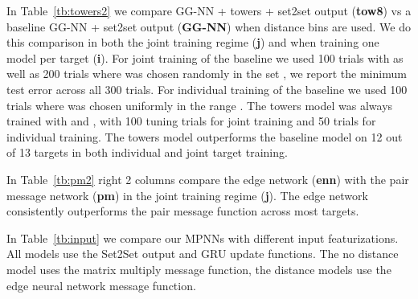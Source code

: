 \documentclass{article}
\begin{document}
In Table~\ref{tb:towers2} we compare GG-NN + towers + set2set output (\textbf{tow8}) vs a baseline GG-NN + set2set output (\textbf{GG-NN}) when distance bins are used.  We do this comparison in both the joint training regime (\textbf{j}) and when training one model per target (\textbf{i}). For joint training of the baseline we used 100 trials with  as well as 200 trials where  was chosen randomly in the set , we report the minimum test error across all 300 trials. For individual training of the baseline we used 100 trials where  was chosen uniformly in the range . The towers model was always trained with  and , with 100 tuning trials for joint training and 50 trials for individual training. The towers model outperforms the baseline model on 12 out of 13 targets in both individual and joint target training.

In Table~\ref{tb:pm2} right 2 columns compare the edge network (\textbf{enn}) with the pair message network (\textbf{pm}) in the joint training regime (\textbf{j}). The edge network consistently outperforms the pair message function across most targets. 

In Table~\ref{tb:input} we compare our MPNNs with different input featurizations. All models use the Set2Set output and GRU update functions. The no distance model uses the matrix multiply message function, the distance models use the edge neural network message function. 
\end{document}
